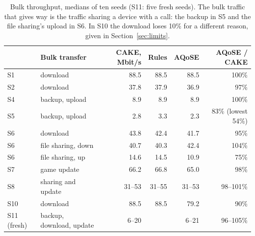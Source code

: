 \documentclass[11pt,a4paper]{article}
\begin{document}
\begin{table}[H]\centering\small
\begin{tabular}{@{}llrrrr@{}}
\toprule
 & Bulk transfer & CAKE, Mbit/s & Rules & AQoSE & AQoSE / CAKE \\
\midrule
S1 & download & 88.5 & 88.5 & 88.5 & 100\% \\
S2 & download & 37.8 & 37.9 & 36.9 & 97\% \\
S4 & backup, upload & 8.9 & 8.9 & 8.9 & 100\% \\
S5 & backup, upload & 2.8 & 3.3 & 2.3 & 83\% (lowest 54\%) \\
S6 & download & 43.8 & 42.4 & 41.7 & 95\% \\
S6 & file sharing, down & 40.7 & 40.3 & 42.4 & 104\% \\
S6 & file sharing, up & 14.6 & 14.5 & 10.9 & 75\% \\
S7 & game update & 66.2 & 66.8 & 65.0 & 98\% \\
S8 & sharing and update & 31--53 & 31--55 & 31--53 & 98--101\% \\
S10 & download & 88.5 & 88.5 & 79.2 & 90\% \\
S11 (fresh) & backup, download, update & 6--20 & & 6--21 & 96--105\% \\
\bottomrule
\end{tabular}
\caption{Bulk throughput, medians of ten seeds (S11: five fresh seeds). The bulk traffic that gives way is the traffic sharing a device with a call: the backup in S5 and the file sharing's upload in S6. In S10 the download loses 10\% for a different reason, given in Section~\ref{sec:limits}.}
\label{tab:bulk}
\end{table}
\end{document}
